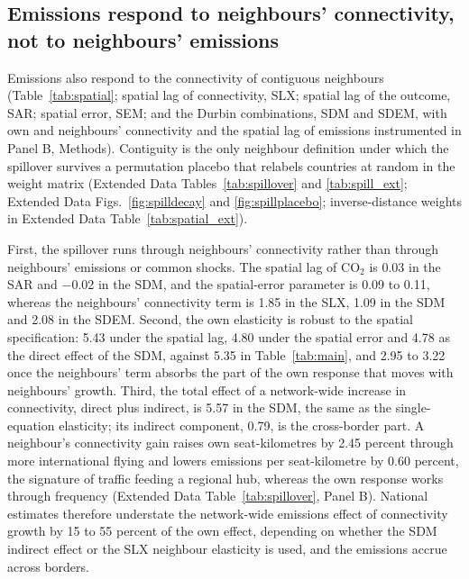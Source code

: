 \documentclass[12pt]{extarticle}
\begin{document}
\subsection*{Emissions respond to neighbours' connectivity, not to
neighbours' emissions}
Emissions also respond to the connectivity of contiguous neighbours
(Table~\ref{tab:spatial}; spatial lag of connectivity, SLX; spatial lag of
the outcome, SAR; spatial error, SEM; and the Durbin combinations, SDM and
SDEM, with own and neighbours' connectivity and the spatial lag of
emissions instrumented in Panel B, Methods). Contiguity is the only
neighbour definition under which the spillover survives a permutation
placebo that relabels countries at random in the weight matrix (Extended
Data Tables~\ref{tab:spillover} and \ref{tab:spill_ext}; Extended Data
Figs.~\ref{fig:spilldecay} and \ref{fig:spillplacebo}; inverse-distance
weights in Extended Data Table~\ref{tab:spatial_ext}).

First, the spillover runs through neighbours' connectivity rather than
through neighbours' emissions or common shocks. The spatial lag of CO$_2$
is 0.03 in the SAR and $-$0.02 in the SDM, and the spatial-error parameter
is 0.09 to 0.11, whereas the neighbours' connectivity term is 1.85 in the
SLX, 1.09 in the SDM and 2.08 in the SDEM. Second, the own elasticity is robust to the spatial specification:
5.43 under the spatial lag, 4.80 under the spatial error and 4.78 as the
direct effect of the SDM, against 5.35 in Table~\ref{tab:main}, and 2.95
to 3.22 once the neighbours' term absorbs the part of the own response
that moves with neighbours' growth. Third, the total effect of a
network-wide increase in connectivity, direct plus indirect, is 5.57 in
the SDM, the same as the single-equation elasticity; its indirect
component, 0.79, is the cross-border part. A neighbour's connectivity gain
raises own seat-kilometres by 2.45 percent through more international
flying and lowers emissions per seat-kilometre by 0.60 percent, the
signature of traffic feeding a regional hub, whereas the own response
works through frequency (Extended Data Table~\ref{tab:spillover}, Panel
B). National estimates therefore understate the network-wide emissions
effect of connectivity growth by 15 to 55 percent of the own effect,
depending on whether the SDM indirect effect or the SLX neighbour
elasticity is used, and the emissions accrue across borders.
\end{document}
